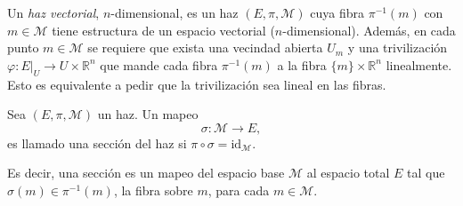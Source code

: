 \begin{mydef}
Un \emph{haz vectorial}, $n$-dimensional, es un haz $(E, \pi, \mathcal{M})$ cuya fibra $\pi^{-1}(m)$ con $m \in \mathcal{M}$ tiene estructura de un espacio vectorial ($n$-dimensional). Adem\'{a}s, en cada punto $m \in \mathcal{M}$ se requiere que exista una vecindad abierta $U_{m}$ y una trivilizaci\'{o}n $\varphi: E \vert_{U} \longrightarrow U \times \mathbb{R}^{n}$ que mande cada fibra $\pi^{-1}(m)$ a la fibra $\{m\} \times \mathbb{R}^{n}$ linealmente. Esto es equivalente a pedir que la trivilizaci\'{o}n sea lineal en las fibras.
\end{mydef}


\begin{mydef}[Secci\'{o}n]
Sea $(E, \pi, \mathcal{M})$ un haz. Un mapeo $$\sigma: \mathcal{M} \longrightarrow E,$$ es llamado una secci\'{o}n del haz si $\pi \circ \sigma = \mathrm{id}_{\mathcal{M}}$.
%
\begin{center}
\end{center}
%
Es decir, una secci\'{o}n es un mapeo del espacio base $\mathcal{M}$ al espacio total $E$ tal que $\sigma(m) \in \pi^{-1}(m)$, la fibra sobre $m$, para cada $m \in \mathcal{M}$.
\end{mydef}

